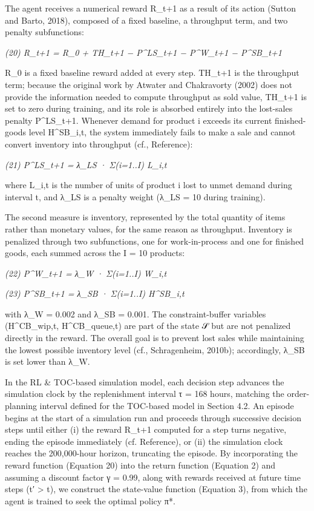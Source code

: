 The agent receives a numerical reward R\_t+1 as a result of its action
(Sutton and Barto, 2018), composed of a fixed baseline, a throughput
term, and two penalty subfunctions:

\emph{(20) R\_t+1 = R\_0 + TH\_t+1 − P\^{}LS\_t+1 − P\^{}W\_t+1 −
P\^{}SB\_t+1}

R\_0 is a fixed baseline reward added at every step. TH\_t+1 is the
throughput term; because the original work by Atwater and Chakravorty
(2002) does not provide the information needed to compute throughput as
sold value, TH\_t+1 is set to zero during training, and its role is
absorbed entirely into the lost-sales penalty P\^{}LS\_t+1. Whenever
demand for product i exceeds its current finished-goods level
H\^{}SB\_i,t, the system immediately fails to make a sale and cannot
convert inventory into throughput (cf., Reference):

\emph{(21) P\^{}LS\_t+1 = λ\_LS · Σ(i=1..I) L\_i,t}

where L\_i,t is the number of units of product i lost to unmet demand
during interval t, and λ\_LS is a penalty weight (λ\_LS = 10 during
training).

The second measure is inventory, represented by the total quantity of
items rather than monetary values, for the same reason as throughput.
Inventory is penalized through two subfunctions, one for work-in-process
and one for finished goods, each summed across the I = 10 products:

\emph{(22) P\^{}W\_t+1 = λ\_W · Σ(i=1..I) W\_i,t}

\emph{(23) P\^{}SB\_t+1 = λ\_SB · Σ(i=1..I) H\^{}SB\_i,t}

with λ\_W = 0.002 and λ\_SB = 0.001. The constraint-buffer variables
(H\^{}CB\_wip,t, H\^{}CB\_queue,t) are part of the state 𝒮 but are not
penalized directly in the reward. The overall goal is to prevent lost
sales while maintaining the lowest possible inventory level (cf.,
Schragenheim, 2010b); accordingly, λ\_SB is set lower than λ\_W.

In the RL \& TOC-based simulation model, each decision step advances the
simulation clock by the replenishment interval τ = 168 hours, matching
the order-planning interval defined for the TOC-based model in Section
4.2. An episode begins at the start of a simulation run and proceeds
through successive decision steps until either (i) the reward R\_t+1
computed for a step turns negative, ending the episode immediately (cf.
Reference), or (ii) the simulation clock reaches the 200,000-hour
horizon, truncating the episode. By incorporating the reward function
(Equation 20) into the return function (Equation 2) and assuming a
discount factor γ = 0.99, along with rewards received at future time
steps (t′ \textgreater{} t), we construct the state-value function
(Equation 3), from which the agent is trained to seek the optimal policy
π*.

